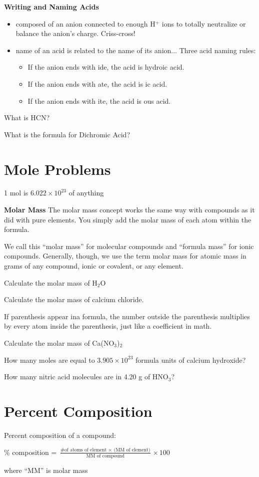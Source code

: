 \documentclass[../hchem.tex]{subfiles}
\begin{document}
\textbf{Writing and Naming Acids}
\begin{itemize}
    \item composed of an anion connected to enough H$^+$ ions to totally neutralize or balance the anion's charge. Criss-cross! 
    \item name of an acid is related to the name of its anion... 
    Three acid naming rules:
    \begin{itemize}
        \item If the anion ends with ide, the acid is hydro\blank ic acid.
        \item If the anion ends with ate, the acid is \blank ic acid.
        \item If the anion ends with ite, the acid is \blank ous acid.
    \end{itemize}
\end{itemize}

\ex What is HCN? 

\ex What is the formula for Dichromic Acid?

\section{Mole Problems}
1 mol is $6.022\times 10^{23}$ of anything

\textbf{Molar Mass}
The molar mass concept works the same way with compounds as it did with pure elements.
You simply add the molar mass of each atom within the formula.

We call this ``molar mass'' for molecular compounds and ``formula mass'' for ionic compounds.
Generally, though, we use the term molar mass for atomic mass in grams of any compound, ionic or covalent, or any element.

\ex Calculate the molar mass of H$_2$O 

\ex Calculate the molar mass of calcium chloride. 

If parenthesis appear ina  formula, the number outside the parenthesis multiplies by every 
atom inside the parenthesis, just like a coefficient in math.

\ex Calculate the molar mass of Ca(NO$_3$)$_2$ 

\ex How many moles are equal to $3.905\times 10^{23}$ formula units of calcium hydroxide? 

\ex How many nitric acid molecules are in 4.20 g of HNO$_3$? 

\section{Percent Composition}
Percent composition of a compound:
\begin{center}
    \% composition = $\frac{\text{\# of atoms of element $\times$ (MM of element)}}{\text{MM of compound}}\times 100$

    where ``MM'' is molar mass 
\end{center}
\end{document}
